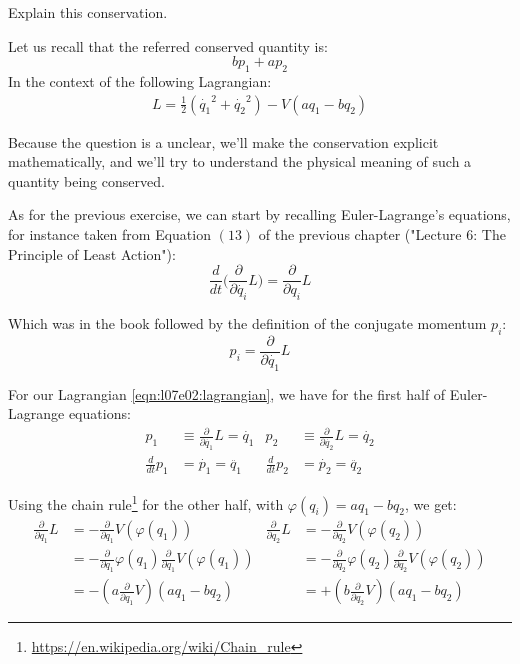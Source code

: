 \documentclass[solutions.tex]{subfiles}
\begin{document}
\maketitle
\begin{exercise}
Explain this conservation.
\end{exercise}
Let us recall that the referred conserved quantity is:
\[
	b p_1 + a p_2
\]
In the context of the following Lagrangian:
\begin{align}
	L = \frac{1}{2}(\dot{q_1}^2+\dot{q_2}^2) - V(a q_1-b q_2)
	\label{eqn:l07e02:lagrangian}
\end{align}

Because the question is a unclear, we'll make the conservation explicit
mathematically, and we'll try to understand the physical meaning
of such a quantity being conserved.

\hrr

As for the previous exercise, we can start by recalling
Euler-Lagrange's equations, for instance taken from
Equation $(13)$ of the previous chapter ("Lecture $6$:
The Principle of Least Action"):
\[
	\frac{d}{dt}\biggl(\frac{\partial}{\partial \dot{q_i}}L\biggr)
	= \frac{\partial}{\partial q_i}L
\]

Which was in the book followed by the definition of the
conjugate momentum $p_i$:
\[
	p_i = \frac{\partial}{\partial \dot{q_1}}L
\]

For our Lagrangian \eqref{eqn:l07e02:lagrangian}, we have
for the first half of Euler-Lagrange equations:
\begin{align}
	p_1 &\equiv \frac{\partial}{\partial \dot{q_1}}L = \dot{q_1} &
	p_2 &\equiv \frac{\partial}{\partial \dot{q_2}}L = \dot{q_2} \label{eqns:l07e02:p1} \\
	\frac{d}{dt}p_1 &= \dot{p_1} = \ddot{q_1} &
	\frac{d}{dt}p_2 &= \dot{p_2} = \ddot{q_2} \label{eqns:l07e02:p2}
\end{align}

Using the chain
rule\footnote{\url{https://en.wikipedia.org/wiki/Chain\_rule}}
for the other half, with $\varphi(q_i) = a q_1 - b q_2$, we get:
\begin{align}
	\frac{\partial}{\partial q_1}L &=
		-\frac{\partial}{\partial q_1}V(\varphi(q_1)) &
	\frac{\partial}{\partial q_2}L &=
		-\frac{\partial}{\partial q_2}V(\varphi(q_2)) \nonumber \\
	~ &= -\frac{\partial}{\partial q_1}\varphi(q_1)
		\frac{\partial}{\partial q_1}V(\varphi(q_1)) &
	~ &= -\frac{\partial}{\partial q_2}\varphi(q_2)
		\frac{\partial}{\partial q_2}V(\varphi(q_2)) \nonumber \\
	~ &= -(a\frac{\partial}{\partial q_1}V)(a q_1 - b q_2) &
	~ &= +(b\frac{\partial}{\partial q_2}V)(a q_1 - b q_2) \label{eqns:l07e02:p3}
\end{align}
\end{document}
